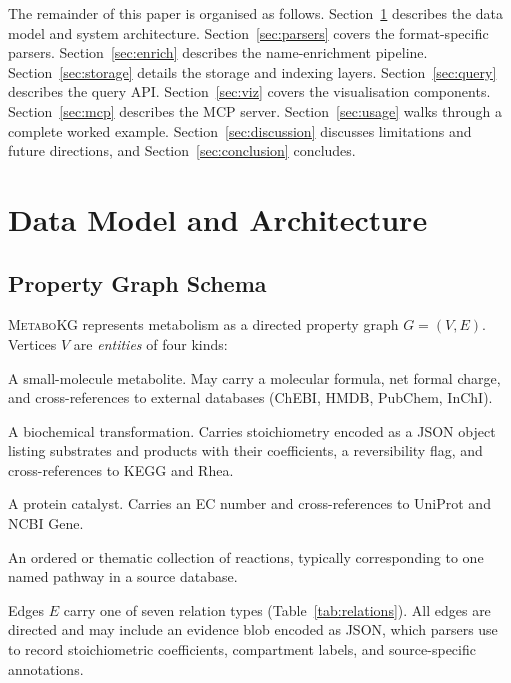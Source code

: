 \documentclass[10pt]{article}
\begin{document}
The remainder of this paper is organised as follows. Section~\ref{sec:design}
describes the data model and system architecture. Section~\ref{sec:parsers}
covers the format-specific parsers. Section~\ref{sec:enrich} describes the
name-enrichment pipeline. Section~\ref{sec:storage} details the storage and
indexing layers. Section~\ref{sec:query} describes the query API.
Section~\ref{sec:viz} covers the visualisation components.
Section~\ref{sec:mcp} describes the MCP server. Section~\ref{sec:usage}
walks through a complete worked example. Section~\ref{sec:discussion}
discusses limitations and future directions, and Section~\ref{sec:conclusion}
concludes.

\section{Data Model and Architecture}
\label{sec:design}

\subsection{Property Graph Schema}

\textsc{MetaboKG} represents metabolism as a directed property graph
$G = (V, E)$. Vertices $V$ are \emph{entities} of four kinds:

\begin{description}[leftmargin=*, itemsep=2pt]
  \item[\texttt{compound}] A small-molecule metabolite. May carry a molecular
    formula, net formal charge, and cross-references to external databases
    (ChEBI, HMDB, PubChem, InChI).
  \item[\texttt{reaction}] A biochemical transformation. Carries stoichiometry
    encoded as a JSON object listing substrates and products with their
    coefficients, a reversibility flag, and cross-references to KEGG and Rhea.
  \item[\texttt{enzyme}] A protein catalyst. Carries an EC number and
    cross-references to UniProt and NCBI Gene.
  \item[\texttt{pathway}] An ordered or thematic collection of reactions,
    typically corresponding to one named pathway in a source database.
\end{description}

Edges $E$ carry one of seven relation types (Table~\ref{tab:relations}).
All edges are directed and may include an evidence blob encoded as JSON,
which parsers use to record stoichiometric coefficients, compartment labels,
and source-specific annotations.
\end{document}
